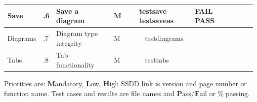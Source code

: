 \documentclass[twoside,letterpaper]{article}
\begin{document}
\begin{landscape}
\begin{flushleft}
\begin{supertabular}[c]{|
                        m{0.9in}|m{0.4in}|m{2.0in}|
                        m{0.4in}|m{0.5in}|m{1.0in}|
                        m{1.0in}|m{1.0in}|c|
                       }
  Save
  & .6
  & Save a diagram 
  & \centering M 
  & ~ 
  & testsave \newline 
    testsaveas
  & FAIL \newline
    PASS
  & ~ \newline
    ~
  & ~ \newline
    ~
\\\hline

  Diagrams
  & .7 
  & Diagram type integrity 
  & \centering M 
  & ~ 
  & ~ testdiagrams
  & ~ 
  & ~ 
  & ~ 
\\\hline

  Tabs
  & .8 
  & Tab functionality 
  & \centering M 
  & ~ 
  & ~ testtabs
  & ~ 
  & ~ 
  & ~ 
\\\hline

\end{supertabular}
\end{flushleft}

{Priorities are: \textbf{M}andatory, \textbf{L}ow, \textbf{H}igh}
{SSDD link is version and page number or function name.}
{Test cases and results are file names and \textbf{P}ass/\textbf  {F}ail or \% passing.}


\bigskip

\end{landscape}
\end{document}
